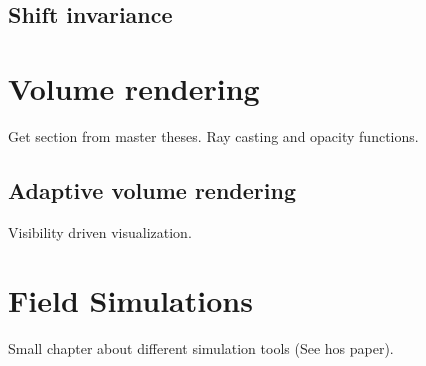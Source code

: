 \subsection{Shift invariance}

\section{Volume rendering}

Get section from master theses. Ray casting and opacity functions.

\subsection{Adaptive volume rendering}

Visibility driven visualization.

\section{Field Simulations}

Small chapter about different simulation tools (See hos paper).
			
\endinput
